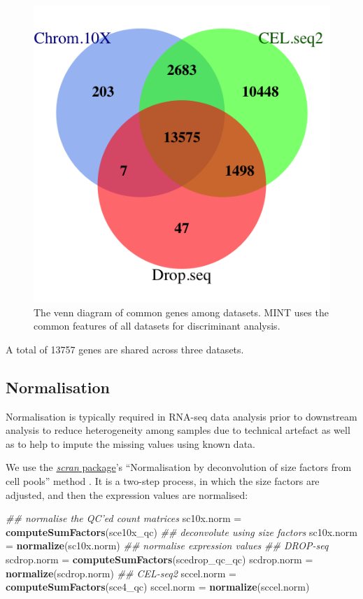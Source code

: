 \documentclass[]{book}
\newenvironment{Shaded}{\begin{snugshade}}{\end{snugshade}}
\newcommand{\CommentTok}[1]{\textcolor[rgb]{0.56,0.35,0.01}{\textit{#1}}}
\newcommand{\KeywordTok}[1]{\textcolor[rgb]{0.13,0.29,0.53}{\textbf{#1}}}
\newcommand{\NormalTok}[1]{#1}
\newcommand{\StringTok}[1]{\textcolor[rgb]{0.31,0.60,0.02}{#1}}
\theoremstyle{definition}
\theoremstyle{definition}
\theoremstyle{definition}
\theoremstyle{remark}
\begin{document}
\begin{figure}[ht]

{\centering \includegraphics[width=0.4\linewidth]{figures/GeneVenn} 

}

\caption{ The venn diagram of common genes among datasets. MINT uses the common features of all datasets for discriminant analysis.}\label{fig:1-vennDiag}
\end{figure}

A total of 13757 genes are shared across three datasets.

\hypertarget{normalisation}{%
\subsection{Normalisation}\label{normalisation}}

Normalisation is typically required in RNA-seq data analysis prior to
downstream analysis to reduce heterogeneity among samples due to
technical artefact as well as to help to impute the missing values using
known data.

We use the
\href{http://bioconductor.org/packages/release/bioc/html/scran.html}{\emph{scran}
package}'s ``Normalisation by deconvolution of size factors from cell
pools'' method \citep{scnorm}. It is a two-step process, in which the
size factors are adjusted, and then the expression values are
normalised:

\begin{Shaded}
\begin{Highlighting}[]
\CommentTok{## normalise the QC'ed count matrices}
\NormalTok{sc10x.norm =}\StringTok{  }\KeywordTok{computeSumFactors}\NormalTok{(sce10x_qc) }\CommentTok{## deconvolute using size factors}
\NormalTok{sc10x.norm =}\StringTok{  }\KeywordTok{normalize}\NormalTok{(sc10x.norm) }\CommentTok{## normalise expression values}
\CommentTok{## DROP-seq}
\NormalTok{scdrop.norm =}\StringTok{ }\KeywordTok{computeSumFactors}\NormalTok{(scedrop_qc_qc)}
\NormalTok{scdrop.norm =}\StringTok{ }\KeywordTok{normalize}\NormalTok{(scdrop.norm)}
\CommentTok{## CEL-seq2}
\NormalTok{sccel.norm =}\StringTok{  }\KeywordTok{computeSumFactors}\NormalTok{(sce4_qc)}
\NormalTok{sccel.norm =}\StringTok{  }\KeywordTok{normalize}\NormalTok{(sccel.norm)}
\end{Highlighting}
\end{Shaded}
\end{document}
